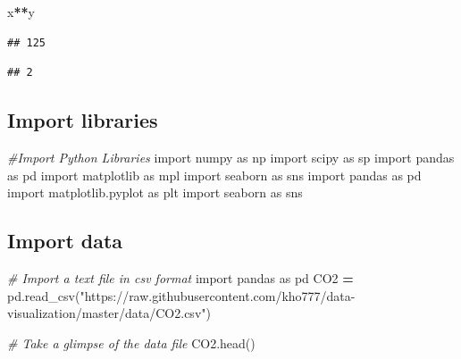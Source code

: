 \documentclass[]{book}
\newenvironment{Shaded}{\begin{snugshade}}{\end{snugshade}}
\newcommand{\CommentTok}[1]{\textcolor[rgb]{0.56,0.35,0.01}{\textit{#1}}}
\newcommand{\ImportTok}[1]{#1}
\newcommand{\NormalTok}[1]{#1}
\newcommand{\OperatorTok}[1]{\textcolor[rgb]{0.81,0.36,0.00}{\textbf{#1}}}
\newcommand{\StringTok}[1]{\textcolor[rgb]{0.31,0.60,0.02}{#1}}
\begin{document}
\begin{Shaded}
\begin{Highlighting}[]
\NormalTok{x}\OperatorTok{**}\NormalTok{y}
\end{Highlighting}
\end{Shaded}

\begin{verbatim}
## 125
\end{verbatim}

\begin{Shaded}
\end{Shaded}

\begin{verbatim}
## 2
\end{verbatim}

\hypertarget{import-libraries}{%
\subsection{Import libraries}\label{import-libraries}}

\begin{Shaded}
\begin{Highlighting}[]
\CommentTok{#Import Python Libraries}
\ImportTok{import}\NormalTok{ numpy }\ImportTok{as}\NormalTok{ np}
\ImportTok{import}\NormalTok{ scipy }\ImportTok{as}\NormalTok{ sp}
\ImportTok{import}\NormalTok{ pandas }\ImportTok{as}\NormalTok{ pd}
\ImportTok{import}\NormalTok{ matplotlib }\ImportTok{as}\NormalTok{ mpl}
\ImportTok{import}\NormalTok{ seaborn }\ImportTok{as}\NormalTok{ sns}
\ImportTok{import}\NormalTok{ pandas }\ImportTok{as}\NormalTok{ pd}
\ImportTok{import}\NormalTok{ matplotlib.pyplot }\ImportTok{as}\NormalTok{ plt}
\ImportTok{import}\NormalTok{ seaborn }\ImportTok{as}\NormalTok{ sns}
\end{Highlighting}
\end{Shaded}

\hypertarget{import-data}{%
\subsection{Import data}\label{import-data}}

\begin{Shaded}
\begin{Highlighting}[]

\CommentTok{# Import a text file in csv format}
\ImportTok{import}\NormalTok{ pandas }\ImportTok{as}\NormalTok{ pd}
\NormalTok{CO2 }\OperatorTok{=}\NormalTok{ pd.read_csv(}\StringTok{"https://raw.githubusercontent.com/kho777/data-visualization/master/data/CO2.csv"}\NormalTok{)}

\CommentTok{# Take a glimpse of the data file}
\NormalTok{CO2.head()}
\end{Highlighting}
\end{Shaded}
\end{document}
